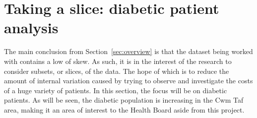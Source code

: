 \section{Taking a slice: diabetic patient analysis}\label{sec:diabetes}

The main conclusion from Section~\ref{sec:overview} is that the dataset being
worked with contains a low of skew. As such, it is in the interest of the
research to consider subsets, or slices, of the data. The hope of which is to
reduce the amount of internal variation caused by trying to observe and
investigate the costs of a huge variety of patients. In this section, the focus
will be on diabetic patients. As will be seen, the diabetic population is
increasing in the Cwm Taf area, making it an area of interest to the Health
Board aside from this project. 
